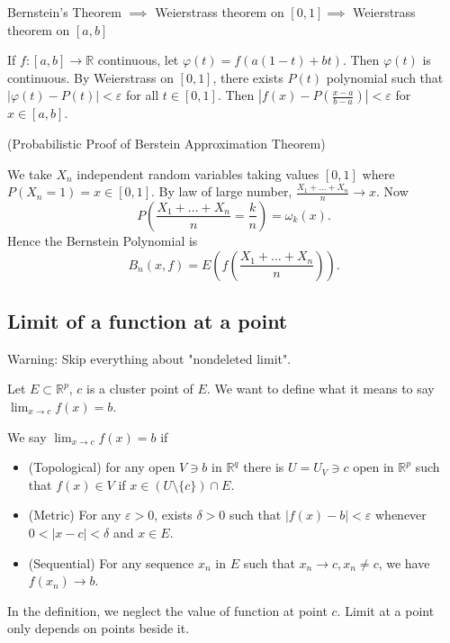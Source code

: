 
\begin{remark}
	Bernstein's Theorem $\implies$ Weierstrass theorem on $[0,1]\implies$  Weierstrass theorem on $[a,b]$

If $f: [a,b] \to \mathbb{R}$ continuous, let $\varphi(t) = f\left( a(1-t) + bt \right) $. Then $\varphi(t)$ is continuous. By Weierstrass on $[0,1]$, there exists $P(t)$ polynomial such that $\left| \varphi(t) - P(t) \right| <\varepsilon$ for all $t \in [0,1]$. Then $\left| f(x) - P(\frac{x-a}{b-a})  \right| < \varepsilon$ for $x \in [a,b]$.
\end{remark}

\begin{remark}
	(Probabilistic Proof of Berstein Approximation Theorem)

	We take $X_n$ independent random variables taking values  $[0,1]$ where $P(X_n = 1) = x \in  [0,1]$. By law of large number, $\frac{X_1 + \ldots + X_n}{n}\to x$. Now \[
		P\left( \frac{X_1+\ldots+ X_n}{n}= \frac{k}{n} \right)  = \omega_k(x)
	.\] 
	Hence the Bernstein Polynomial is
	\[
		B_n(x, f) = E\left( f\left( \frac{X_1+ \ldots + X_n}{n} \right)  \right) 
	.\] 
\end{remark}

\subsection{Limit of a function at a point}

Warning: Skip everything about "nondeleted limit".

Let $E \subset \mathbb{R}^p$, $c$ is a cluster point of $E$. We want to define what it means to say $\lim_{x \to c} f(x) = b$.

\begin{definition}
	We say $\lim_{x \to c} f(x) = b$ if
	\begin{itemize}
		\item (Topological)
			for any open $V \ni b$ in $\mathbb{R}^q$ there is $U = U_V \ni c$ open in $\mathbb{R}^p$ such that $f(x) \in V$ if $x \in \left( U \setminus  \{c\}  \right) \cap E $.
		\item (Metric)
			For any $\varepsilon>0$, exists $\delta>0$ such that $|f(x) - b|< \varepsilon$ whenever $0<|x - c| < \delta$ and $x \in E$.
		\item (Sequential)
			For any sequence $x_n$ in $E$ such that $x_n \to c, x_n \neq c$, we have $f(x_n) \to b$.
	\end{itemize}
\end{definition}
\begin{remark}
	In the definition, we neglect the value of function at point $c$. Limit at a point only depends on points beside it.
\end{remark}

